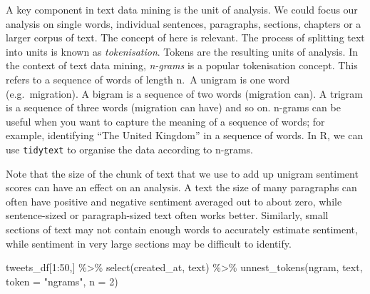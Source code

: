 \documentclass[
  letterpaper,
  DIV=11,
  numbers=noendperiod]{scrreprt}
\newenvironment{Shaded}{\begin{snugshade}}{\end{snugshade}}
\newcommand{\AttributeTok}[1]{\textcolor[rgb]{0.40,0.45,0.13}{#1}}
\newcommand{\DecValTok}[1]{\textcolor[rgb]{0.68,0.00,0.00}{#1}}
\newcommand{\FunctionTok}[1]{\textcolor[rgb]{0.28,0.35,0.67}{#1}}
\newcommand{\NormalTok}[1]{\textcolor[rgb]{0.00,0.23,0.31}{#1}}
\newcommand{\SpecialCharTok}[1]{\textcolor[rgb]{0.37,0.37,0.37}{#1}}
\newcommand{\StringTok}[1]{\textcolor[rgb]{0.13,0.47,0.30}{#1}}
\begin{document}
A key component in text data mining is the unit of analysis. We could
focus our analysis on single words, individual sentences, paragraphs,
sections, chapters or a larger corpus of text. The concept of here is
relevant. The process of splitting text into units is known as
\emph{tokenisation}. Tokens are the resulting units of analysis. In the
context of text data mining, \emph{n-grams} is a popular tokenisation
concept. This refers to a sequence of words of length n.~A unigram is
one word (e.g.~migration). A bigram is a sequence of two words
(migration can). A trigram is a sequence of three words (migration can
have) and so on. n-grams can be useful when you want to capture the
meaning of a sequence of words; for example, identifying ``The United
Kingdom'' in a sequence of words. In R, we can use \texttt{tidytext} to
organise the data according to n-grams.

\begin{tcolorbox}[enhanced jigsaw, arc=.35mm, opacityback=0, leftrule=.75mm, bottomrule=.15mm, titlerule=0mm, opacitybacktitle=0.6, left=2mm, colframe=quarto-callout-note-color-frame, rightrule=.15mm, colback=white, bottomtitle=1mm, toprule=.15mm, breakable, title=\textcolor{quarto-callout-note-color}{\faInfo}\hspace{0.5em}{Note}, toptitle=1mm, coltitle=black, colbacktitle=quarto-callout-note-color!10!white]

Note that the size of the chunk of text that we use to add up unigram
sentiment scores can have an effect on an analysis. A text the size of
many paragraphs can often have positive and negative sentiment averaged
out to about zero, while sentence-sized or paragraph-sized text often
works better. Similarly, small sections of text may not contain enough
words to accurately estimate sentiment, while sentiment in very large
sections may be difficult to identify.

\end{tcolorbox}

\begin{Shaded}
\begin{Highlighting}[]
\NormalTok{tweets\_df[}\DecValTok{1}\SpecialCharTok{:}\DecValTok{50}\NormalTok{,] }\SpecialCharTok{\%\textgreater{}\%}
    \FunctionTok{select}\NormalTok{(created\_at, text) }\SpecialCharTok{\%\textgreater{}\%}
    \FunctionTok{unnest\_tokens}\NormalTok{(ngram, text, }\AttributeTok{token =} \StringTok{"ngrams"}\NormalTok{, }\AttributeTok{n =} \DecValTok{2}\NormalTok{)}
\end{Highlighting}
\end{Shaded}
\end{document}
